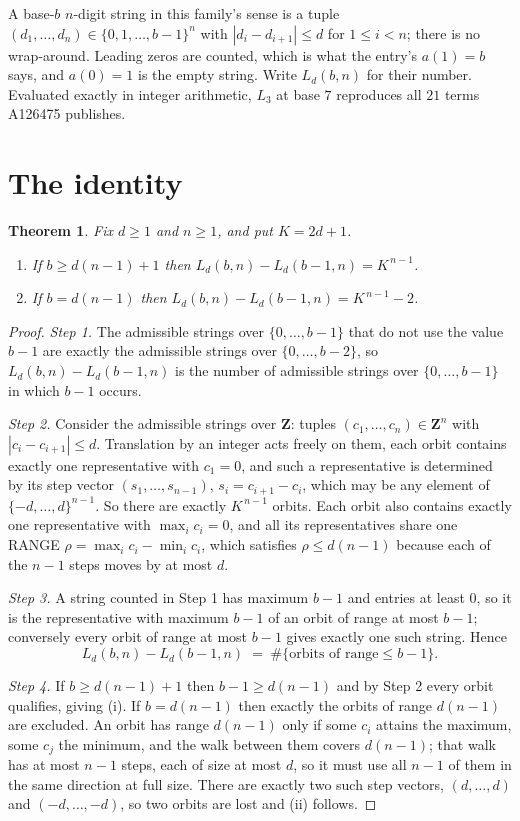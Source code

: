 \documentclass[11pt,a4paper]{article}
\theoremstyle{plain}
\newtheorem{theorem}{Theorem}
\theoremstyle{definition}
\begin{document}
A base-$b$ $n$-digit string in this family's sense is a tuple
$(d_1,\dots,d_n)\in\{0,1,\dots,b-1\}^{n}$ with $|d_i-d_{i+1}|\le d$ for $1\le i<n$; there
is no wrap-around. Leading zeros are counted, which is what the entry's $a(1)=b$ says, and
$a(0)=1$ is the empty string. Write $L_d(b,n)$ for their number. Evaluated exactly in integer
arithmetic, $L_{3}$ at base $7$ reproduces all $21$ terms A126475 publishes.

\section{The identity}

\begin{theorem}
Fix $d\ge1$ and $n\ge1$, and put $K=2d+1$.
\begin{enumerate}
\item[(i)] If $b\ge d(n-1)+1$ then $L_d(b,n)-L_d(b-1,n)=K^{\,n-1}$.
\item[(ii)] If $b=d(n-1)$ then $L_d(b,n)-L_d(b-1,n)=K^{\,n-1}-2$.
\end{enumerate}
\end{theorem}

\begin{proof}
\emph{Step 1.} The admissible strings over $\{0,\dots,b-1\}$ that do not use the value $b-1$
are exactly the admissible strings over $\{0,\dots,b-2\}$, so $L_d(b,n)-L_d(b-1,n)$ is the
number of admissible strings over $\{0,\dots,b-1\}$ in which $b-1$ occurs.

\emph{Step 2.} Consider the admissible strings over $\mathbf{Z}$: tuples
$(c_1,\dots,c_n)\in\mathbf{Z}^{n}$ with $|c_i-c_{i+1}|\le d$. Translation by an integer acts
freely on them, each orbit contains exactly one representative with $c_1=0$, and such a
representative is determined by its step vector $(s_1,\dots,s_{n-1})$, $s_i=c_{i+1}-c_i$,
which may be any element of $\{-d,\dots,d\}^{n-1}$. So there are exactly $K^{\,n-1}$ orbits.
Each orbit also contains exactly one representative with $\max_i c_i=0$, and all its
representatives share one RANGE $\rho=\max_ic_i-\min_ic_i$, which satisfies
$\rho\le d(n-1)$ because each of the $n-1$ steps moves by at most $d$.

\emph{Step 3.} A string counted in Step 1 has maximum $b-1$ and entries at least $0$, so it is
the representative with maximum $b-1$ of an orbit of range at most $b-1$; conversely every orbit
of range at most $b-1$ gives exactly one such string. Hence
\[
L_d(b,n)-L_d(b-1,n)\;=\;\#\{\text{orbits of range}\le b-1\} .
\]

\emph{Step 4.} If $b\ge d(n-1)+1$ then $b-1\ge d(n-1)$ and by Step 2 every orbit qualifies,
giving (i). If $b=d(n-1)$ then exactly the orbits of range $d(n-1)$ are excluded. An orbit has
range $d(n-1)$ only if some $c_i$ attains the maximum, some $c_j$ the minimum, and the walk
between them covers $d(n-1)$; that walk has at most $n-1$ steps, each of size at most $d$, so it
must use all $n-1$ of them in the same direction at full size. There are exactly two such step
vectors, $(d,\dots,d)$ and $(-d,\dots,-d)$, so two orbits are lost and (ii) follows.
\end{proof}
\end{document}
